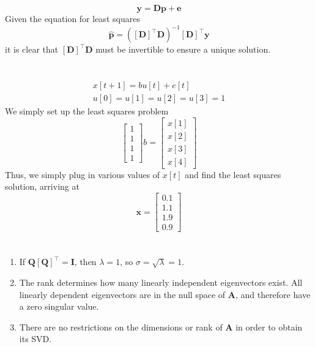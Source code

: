 \documentclass[]{article}
\newcommand{\unit}[1]{\bm{\hat{#1}}}
\newcommand{\tpose}[1]{\left[#1\right]^{\! \top} \!\!}
\begin{document}
\section{}

\begin{equation}
	\bm{y} = \bm{Dp} + \bm{e}
\end{equation}
Given the equation for least squares
\begin{equation}
	\unit{p} = (\tpose{\bm{D}} \bm{D})^{-1} \tpose{\bm{D}} \bm{y}
\end{equation}
it is clear that \(\tpose{\bm{D}} \bm{D}\) must be invertible to ensure a unique solution.

\section{}

\begin{gather}
	x[t + 1] = b u[t] + e[t] \\
	u[0] = u[1] = u[2] = u[3] = 1
\end{gather}
We simply set up the least squares problem
\begin{equation}
	\begin{bmatrix}
	1 \\
	1 \\
	1 \\
	1
	\end{bmatrix}b =
	\begin{bmatrix}
	x[1] \\
	x[2] \\
	x[3] \\
	x[4]
	\end{bmatrix}
\end{equation}
Thus, we simply plug in various values of \(x[t]\) and find the least squares solution, arriving at
\begin{equation}
	\bm{x} =
	\begin{bmatrix}
	0.1 \\
	1.1 \\
	1.9 \\
	0.9
	\end{bmatrix}
\end{equation}

\section{}

\begin{enumerate}
	\item If \(\bm{Q}\tpose{\bm{Q}} = \bm{I}\), then \(\lambda = 1\), so \(\sigma = \sqrt{\lambda} = 1\).
	\item The rank determines how many linearly independent eigenvectors exist. All linearly dependent eigenvectors are in the null space of \(\bm{A}\), and therefore have a zero singular value.
	\item There are no restrictions on the dimensions or rank of \(\bm{A}\) in order to obtain its SVD.
\end{enumerate}
\end{document}
